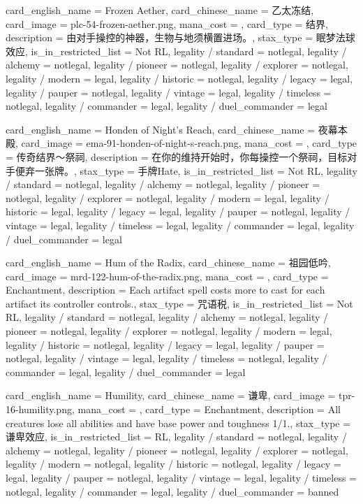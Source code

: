 \documentclass[lang = cn, color = black, 10pt]{AllThatStax}
\begin{document}
\card
{
	card_english_name = {Frozen Aether},
	card_chinese_name = {乙太冻结},
	card_image = plc-54-frozen-aether.png,
	mana_cost = ,
	card_type = 结界,
	description = {由对手操控的神器，生物与地须横置进场。},
	stax_type = 眠梦法球效应,
	is_in_restricted_list = Not RL,
	legality / standard = notlegal,
	legality / alchemy = notlegal,
	legality / pioneer = notlegal,
	legality / explorer = notlegal,
	legality / modern = legal,
	legality / historic = notlegal,
	legality / legacy = legal,
	legality / pauper = notlegal,
	legality / vintage = legal,
	legality / timeless = notlegal,
	legality / commander = legal,
	legality / duel_commander = legal
}

\card
{
	card_english_name = {Honden of Night's Reach},
	card_chinese_name = {夜幕本殿},
	card_image = ema-91-honden-of-night-s-reach.png,
	mana_cost = ,
	card_type = 传奇结界～祭祠,
	description = {在你的维持开始时，你每操控一个祭祠，目标对手便弃一张牌。},
	stax_type = 手牌Hate,
	is_in_restricted_list = Not RL,
	legality / standard = notlegal,
	legality / alchemy = notlegal,
	legality / pioneer = notlegal,
	legality / explorer = notlegal,
	legality / modern = legal,
	legality / historic = legal,
	legality / legacy = legal,
	legality / pauper = notlegal,
	legality / vintage = legal,
	legality / timeless = legal,
	legality / commander = legal,
	legality / duel_commander = legal
}

\card
{
	card_english_name = {Hum of the Radix},
	card_chinese_name = {祖园低吟},
	card_image = mrd-122-hum-of-the-radix.png,
	mana_cost = ,
	card_type = Enchantment,
	description = {Each artifact spell costs  more to cast for each artifact its controller controls.},
	stax_type = 咒语税,
	is_in_restricted_list = Not RL,
	legality / standard = notlegal,
	legality / alchemy = notlegal,
	legality / pioneer = notlegal,
	legality / explorer = notlegal,
	legality / modern = legal,
	legality / historic = notlegal,
	legality / legacy = legal,
	legality / pauper = notlegal,
	legality / vintage = legal,
	legality / timeless = notlegal,
	legality / commander = legal,
	legality / duel_commander = legal
}

\card
{
	card_english_name = {Humility},
	card_chinese_name = {谦卑},
	card_image = tpr-16-humility.png,
	mana_cost = ,
	card_type = Enchantment,
	description = {All creatures lose all abilities and have base power and toughness 1/1.},
	stax_type = 谦卑效应,
	is_in_restricted_list = RL,
	legality / standard = notlegal,
	legality / alchemy = notlegal,
	legality / pioneer = notlegal,
	legality / explorer = notlegal,
	legality / modern = notlegal,
	legality / historic = notlegal,
	legality / legacy = legal,
	legality / pauper = notlegal,
	legality / vintage = legal,
	legality / timeless = notlegal,
	legality / commander = legal,
	legality / duel_commander = banned
}
\end{document}
